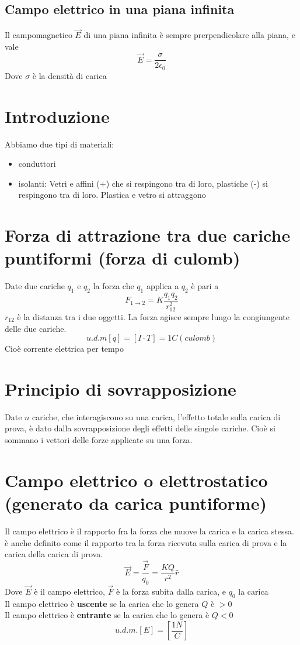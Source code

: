 \documentclass[a4paper]{report}
\begin{document}
  \subsection{Campo elettrico in una piana infinita}
  Il campomagnetico $\vec{E}$ di una piana infinita è sempre prerpendicolare alla piana, e vale
  $$ \vec{E} = \frac{\sigma}{2\epsilon_0} $$
  Dove $\sigma$ è la densità di carica

  \section{Introduzione}
  Abbiamo due tipi di materiali:
  \begin{itemize}
    \item conduttori
    \item isolanti: Vetri e affini (+) che si respingono tra di loro, plastiche (-) si respingono tra di loro. Plastica e vetro si attraggono
  \end{itemize}

  \section{Forza di attrazione tra due cariche puntiformi (forza di culomb)}
  Date due cariche $q_1$ e $q_2$ la forza che $q_1$ applica a $q_2$ è pari a
  $$ F_{1 \rightarrow 2} = K \frac{q_1 q_2}{r_{12}^2} $$
  $r_{12}$ è la distanza tra i due oggetti. La forza agisce sempre lungo la congiungente delle due cariche.
  $$u.d.m[q] = [I\cdot T] = 1C (culomb)$$
  Cioè corrente elettrica per tempo

  \section{Principio di sovrapposizione}
  Date $n$ cariche, che interagiscono su una carica, l'effetto totale sulla carica di prova, è dato dalla sovrapposizione degli effetti delle singole cariche. Cioè si sommano i vettori delle forze applicate su una forza.

  \section{Campo elettrico o elettrostatico (generato da carica puntiforme)}
  Il campo elettrico è il rapporto fra la forza che muove la carica e la carica stessa. è anche definito come il rapporto tra la forza ricevuta sulla carica di prova e la carica della carica di prova.
  $$\vec{E} = \frac{\vec{F}}{q_0} = \frac{K Q}{r^2} \hat{r}$$
  Dove $\vec{E}$ è il campo elettrico, $\vec{F}$ è la forza subita dalla carica, e $q_0$ la carica\\
  Il campo elettrico è \textbf{uscente} se la carica che lo genera $Q$ è $>0$\\
  Il campo elettrico è \textbf{entrante} se la carica che lo genera è $Q<0$
  $$ u.d.m.[E] = [\frac{1N}{C}]$$
\end{document}
